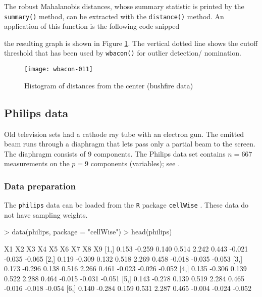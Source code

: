 \documentclass[a4paper,oneside,11pt,DIV=12]{scrartcl}
\newcommand{\code}[1]{{\texttt{#1}}}
\begin{document}
\noindent The robust Mahalanobis distances, whose summary statistic is printed by the \code{summary()} method, can be extracted with the \code{distance()} method. 
An application of this function is the following code snipped 

\begin{Schunk}
\end{Schunk}
\noindent the resulting graph is shown in Figure \ref{fig:bushfire_hist}. The vertical dotted line shows the cutoff threshold that has been used by \code{wbacon()} for outlier detection/ nomination. 

\begin{figure}[htb]
\begin{center}
\texttt{[image: wbacon-011]}
\caption{Histogram of distances from the center (bushfire data)}\label{fig:bushfire_hist}
\end{center}
\end{figure}




\subsection{Philips data}
Old television sets had a cathode ray tube with an electron gun. The emitted beam runs through a diaphragm that lets pass only a partial beam to the screen. The diaphragm consists of 9 components. The Philips data set contains $n = 667$ measurements on the $p = 9$ components (variables); see \citet{rousseeuw_van-driessen_1999}. 

\subsubsection*{Data preparation}
The \code{philips} data can be loaded from the \code{R} package \code{cellWise} \citep{raymaekers_rousseeuw_2020}. These data do not have sampling weights. 
\begin{Schunk}
\begin{Sinput}
> data(philips, package = "cellWise")
> head(philips)
\end{Sinput}
\begin{Soutput}
        X1     X2    X3    X4    X5    X6     X7     X8     X9
[1,] 0.153 -0.259 0.140 0.514 2.242 0.443 -0.021 -0.035 -0.065
[2,] 0.119 -0.309 0.132 0.518 2.269 0.458 -0.018 -0.035 -0.053
[3,] 0.173 -0.296 0.138 0.516 2.266 0.461 -0.023 -0.026 -0.052
[4,] 0.135 -0.306 0.139 0.522 2.288 0.464 -0.015 -0.031 -0.051
[5,] 0.143 -0.278 0.139 0.519 2.284 0.465 -0.016 -0.018 -0.054
[6,] 0.140 -0.284 0.159 0.531 2.287 0.465 -0.004 -0.024 -0.052
\end{Soutput}
\end{Schunk}
\end{document}

